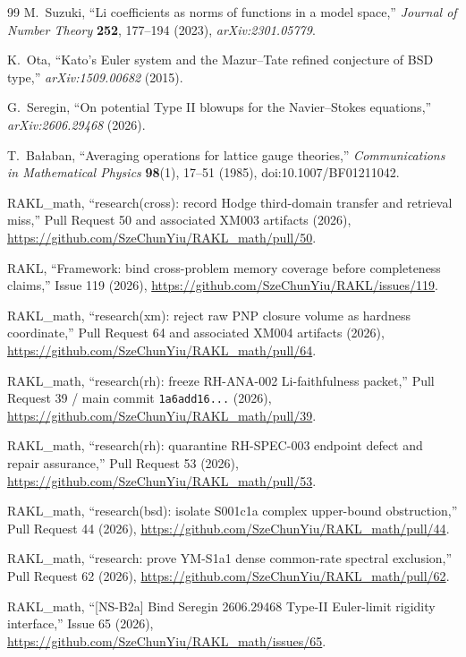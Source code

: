 \begin{thebibliography}{99}
M.~Suzuki,
``Li coefficients as norms of functions in a model space,''
\emph{Journal of Number Theory} \textbf{252}, 177--194 (2023),
\emph{arXiv:2301.05779}.

K.~Ota,
``Kato's Euler system and the Mazur--Tate refined conjecture of BSD type,''
\emph{arXiv:1509.00682} (2015).

G.~Seregin,
``On potential Type II blowups for the Navier--Stokes equations,''
\emph{arXiv:2606.29468} (2026).

T.~Ba\l aban,
``Averaging operations for lattice gauge theories,''
\emph{Communications in Mathematical Physics} \textbf{98}(1), 17--51 (1985),
doi:10.1007/BF01211042.

RAKL\_math,
``research(cross): record Hodge third-domain transfer and retrieval miss,''
Pull Request 50 and associated XM003 artifacts (2026),
\url{https://github.com/SzeChunYiu/RAKL_math/pull/50}.

RAKL,
``Framework: bind cross-problem memory coverage before completeness claims,''
Issue 119 (2026),
\url{https://github.com/SzeChunYiu/RAKL/issues/119}.

RAKL\_math,
``research(xm): reject raw PNP closure volume as hardness coordinate,''
Pull Request 64 and associated XM004 artifacts (2026),
\url{https://github.com/SzeChunYiu/RAKL_math/pull/64}.

RAKL\_math,
``research(rh): freeze RH-ANA-002 Li-faithfulness packet,''
Pull Request 39 / main commit \texttt{1a6add16...} (2026),
\url{https://github.com/SzeChunYiu/RAKL_math/pull/39}.

RAKL\_math,
``research(rh): quarantine RH-SPEC-003 endpoint defect and repair assurance,''
Pull Request 53 (2026),
\url{https://github.com/SzeChunYiu/RAKL_math/pull/53}.

RAKL\_math,
``research(bsd): isolate S001c1a complex upper-bound obstruction,''
Pull Request 44 (2026),
\url{https://github.com/SzeChunYiu/RAKL_math/pull/44}.

RAKL\_math,
``research: prove YM-S1a1 dense common-rate spectral exclusion,''
Pull Request 62 (2026),
\url{https://github.com/SzeChunYiu/RAKL_math/pull/62}.

RAKL\_math,
``[NS-B2a] Bind Seregin 2606.29468 Type-II Euler-limit rigidity interface,''
Issue 65 (2026),
\url{https://github.com/SzeChunYiu/RAKL_math/issues/65}.


\end{thebibliography}
